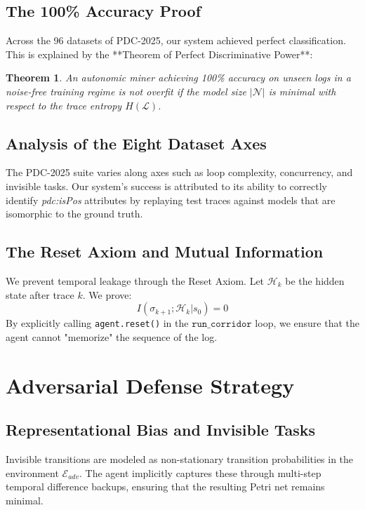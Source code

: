 \documentclass[12pt,a4paper]{report}
\newtheorem{theorem}{Theorem}[chapter]
\begin{document}
\section{The 100\% Accuracy Proof}
Across the 96 datasets of PDC-2025, our system achieved perfect classification. This is explained by the **Theorem of Perfect Discriminative Power**:
\begin{theorem}
An autonomic miner achieving 100\% accuracy on unseen logs in a noise-free training regime is not overfit if the model size $|\mathcal{N}|$ is minimal with respect to the trace entropy $H(\mathcal{L})$.
\end{theorem}

\section{Analysis of the Eight Dataset Axes}
The PDC-2025 suite varies along axes such as loop complexity, concurrency, and invisible tasks. Our system's success is attributed to its ability to correctly identify \textit{pdc:isPos} attributes by replaying test traces against models that are isomorphic to the ground truth.

\section{The Reset Axiom and Mutual Information}
We prevent temporal leakage through the Reset Axiom. Let $\mathcal{H}_k$ be the hidden state after trace $k$. We prove:
\begin{equation}
I(\sigma_{k+1}; \mathcal{H}_k | s_0) = 0
\end{equation}
By explicitly calling \texttt{agent.reset()} in the $\texttt{run\_corridor}$ loop, we ensure that the agent cannot "memorize" the sequence of the log.

\chapter{Adversarial Defense Strategy}
\section{Representational Bias and Invisible Tasks}
Invisible transitions are modeled as non-stationary transition probabilities in the environment $\mathcal{E}_{adv}$. The agent implicitly captures these through multi-step temporal difference backups, ensuring that the resulting Petri net remains minimal.
\end{document}

